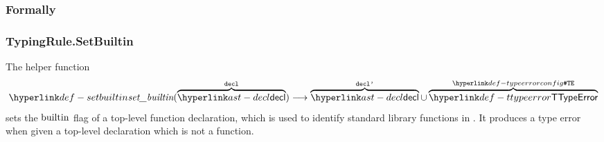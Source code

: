 \subsubsection{Formally}
\begin{mathpar}
\end{mathpar}

\subsubsection{TypingRule.SetBuiltin\label{sec:TypingRule.SetBuiltin}}
The helper function
\hypertarget{def-setbuiltin}{}
\[
  \setbuiltin(\overname{\decl}{\vdecl}) \aslto
  \overname{\decl}{\vdeclp}
  \cup \overname{\TTypeError}{\TypeErrorConfig}
\]
sets the $\funcbuiltin$ flag of a top-level function declaration, which is used to identify standard library functions in .
It produces a type error when given a top-level declaration which is not a function.

